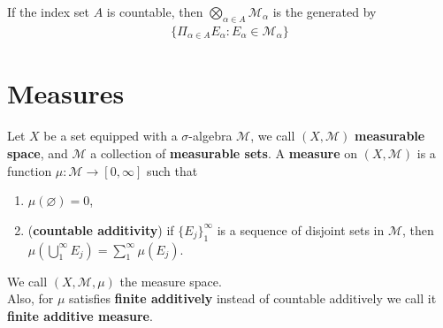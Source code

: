 \begin{proposition}
 \normalfont If the index set $A$ is countable, then $\bigotimes_{\alpha \in A} \mathcal{M}_\alpha$ is the \sal generated by
 \begin{align*}
    \{ \Pi_{\alpha \in A} E_\alpha : E_\alpha \in \mathcal{M}_\alpha \}
 \end{align*}
\end{proposition}

\begin{proposition}
 \normalfont 
\end{proposition}

\begin{proposition}
 \normalfont 
\end{proposition}

\begin{corollary}
 \normalfont 
\end{corollary}





\section{Measures} \label{sec:}
\begin{definition}[Measure]
 \normalfont Let $X$ be a set equipped with a $\sigma$-algebra $\mathcal{M}$, we call $(X, \mathcal{M})$ \textbf{measurable space}, and $\mathcal{M}$ a collection of \textbf{measurable sets}. A \textbf{measure} on $(X, \mathcal{M})$ is a function $\mu: \mathcal{M} \to [0,\infty]$ such that
 \begin{enumerate}
    \item $\mu(\varnothing)= 0$,
    \item (\textbf{countable additivity}) if $\{ E_j \}_1^{\infty}$ is a sequence of disjoint sets in $\mathcal{M}$, then $\mu(\bigcup_{1}^{\infty} E_j) = \sum_{1}^{\infty} \mu(E_j)$.
 \end{enumerate}
 We call $(X, \mathcal{M}, \mu)$ the measure space.
 \\ Also, for $\mu$ satisfies \textbf{finite additively} instead of countable additively we call it \textbf{finite additive measure}.
\end{definition}

